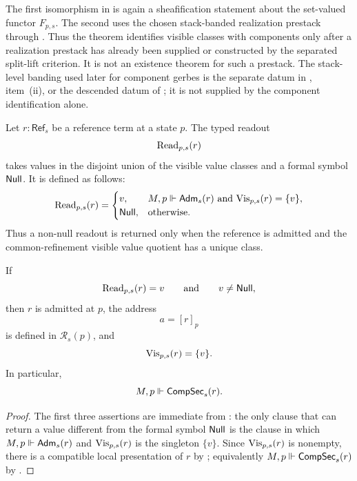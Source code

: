 \begin{remark}\label{rem:component-identification-bookkeeping}
The first isomorphism in  is again a sheafification statement about the set-valued functor $F_{p,s}$. The second uses the chosen stack-banded realization prestack through . Thus the theorem identifies visible classes with components only after a realization prestack has already been supplied or constructed by the separated split-lift criterion. It is not an existence theorem for such a prestack. The stack-level banding used later for component gerbes is the separate datum in , item~\textup{(ii)}, or the descended datum of ; it is not supplied by the component identification alone.
\end{remark}

\begin{definition}\label{def:typed-readout}
Let $r:\mathsf{Ref}_s$ be a reference term at a state $p$. The typed readout
\[
\mathrm{Read}_{p,s}(r)
\]
takes values in the disjoint union of the visible value classes and a formal
symbol $\mathsf{Null}$. It is defined as follows:
\[
\mathrm{Read}_{p,s}(r)=
\begin{cases}
v, & M,p\Vdash \mathsf{Adm}_s(r)\ \text{and}\ \mathrm{Vis}_{p,s}(r)=\{v\},\\
\mathsf{Null}, & \text{otherwise.}
\end{cases}
\]
Thus a non-null readout is returned only when the reference is admitted and the
common-refinement visible value quotient has a unique class.
\end{definition}

\begin{proposition}\label{prop:address-before-value}
If
\[
\mathrm{Read}_{p,s}(r)=v
\qquad\text{and}\qquad
v\neq\mathsf{Null},
\]
then $r$ is admitted at $p$, the address
\[
a=[r]_p
\]
is defined in $\mathcal R_s(p)$, and
\[
\mathrm{Vis}_{p,s}(r)=\{v\}.
\]
In particular,
\[
M,p\Vdash \mathsf{CompSec}_s(r).
\]
\end{proposition}

\begin{proof}
The first three assertions are immediate from : the
only clause that can return a value different from the formal symbol $\mathsf{Null}$ is
the clause in which $M,p\Vdash\mathsf{Adm}_s(r)$ and $\mathrm{Vis}_{p,s}(r)$ is the singleton
$\{v\}$. Since $\mathrm{Vis}_{p,s}(r)$ is nonempty, there is a compatible local
presentation of $r$ by ; equivalently
$M,p\Vdash\mathsf{CompSec}_s(r)$ by .
\end{proof}


